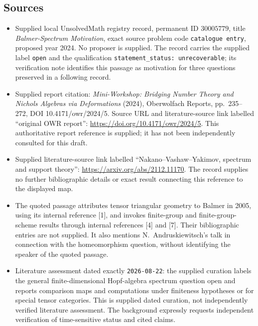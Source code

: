 \documentclass[11pt]{article}
\begin{document}
\subsection{Sources}
\begin{itemize}
\item Supplied local UnsolvedMath registry record, permanent ID \(30005779\), title \emph{Balmer-Spectrum Motivation}, exact source problem code \texttt{catalogue entry}, proposed year 2024. No proposer is supplied. The record carries the supplied label \texttt{open} and the qualification \texttt{statement\_status: unrecoverable}; its verification note identifies this passage as motivation for three questions preserved in a following record.
\item Supplied report citation: \emph{Mini-Workshop: Bridging Number Theory and Nichols Algebras via Deformations} (2024), Oberwolfach Reports, pp.~235--272, DOI 10.4171/owr/2024/5. Source URL and literature-source link labelled ``original OWR report'': \url{https://doi.org/10.4171/owr/2024/5}. This authoritative report reference is supplied; it has not been independently consulted for this draft.
\item Supplied literature-source link labelled ``Nakano--Vashaw--Yakimov, spectrum and support theory'': \url{https://arxiv.org/abs/2112.11170}. The record supplies no further bibliographic details or exact result connecting this reference to the displayed map.
\item The quoted passage attributes tensor triangular geometry to Balmer in 2005, using its internal reference [1], and invokes finite-group and finite-group-scheme results through internal references [4] and [7]. Their bibliographic entries are not supplied. It also mentions N.~Andruskiewitsch's talk in connection with the homeomorphism question, without identifying the speaker of the quoted passage.
\item Literature assessment dated exactly \texttt{2026-08-22}: the supplied curation labels the general finite-dimensional Hopf-algebra spectrum question open and reports comparison maps and computations under finiteness hypotheses or for special tensor categories. This is supplied dated curation, not independently verified literature assessment. The background expressly requests independent verification of time-sensitive status and cited claims.
\end{itemize}
\end{document}
